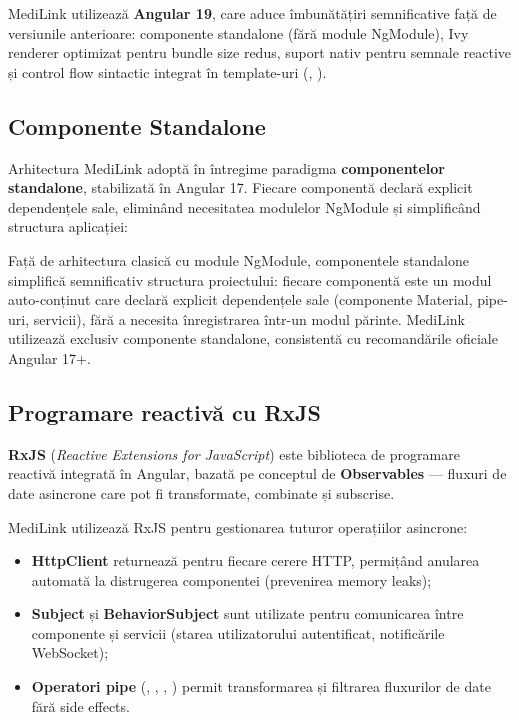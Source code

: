 MediLink utilizează \textbf{Angular 19}, care aduce îmbunătățiri semnificative față de versiunile anterioare: componente standalone (fără module NgModule), Ivy renderer optimizat pentru bundle size redus, suport nativ pentru semnale reactive și control flow sintactic integrat în template-uri (, ).

\subsection{Componente Standalone}

Arhitectura MediLink adoptă în întregime paradigma \textbf{componentelor standalone}, stabilizată în Angular 17. Fiecare componentă declară explicit dependențele sale, eliminând necesitatea modulelor NgModule și simplificând structura aplicației:

Față de arhitectura clasică cu module NgModule, componentele standalone simplifică semnificativ structura proiectului: fiecare componentă este un modul auto-conținut care declară explicit dependențele sale (componente Material, pipe-uri, servicii), fără a necesita înregistrarea într-un modul părinte. MediLink utilizează exclusiv componente standalone, consistentă cu recomandările oficiale Angular 17+.

\subsection{Programare reactivă cu RxJS}

\textbf{RxJS} \cite{rxjs2024} (\textit{Reactive Extensions for JavaScript}) este biblioteca de programare reactivă integrată în Angular, bazată pe conceptul de \textbf{Observables} --- fluxuri de date asincrone care pot fi transformate, combinate și subscrise.

MediLink utilizează RxJS pentru gestionarea tuturor operațiilor asincrone:

\begin{itemize}
  \item \textbf{HttpClient} returnează  pentru fiecare cerere HTTP, permițând anularea automată la distrugerea componentei (prevenirea memory leaks);
  \item \textbf{Subject} și \textbf{BehaviorSubject} sunt utilizate pentru comunicarea între componente și servicii (starea utilizatorului autentificat, notificările WebSocket);
  \item \textbf{Operatori pipe} (, , , ) permit transformarea și filtrarea fluxurilor de date fără side effects.
\end{itemize}

